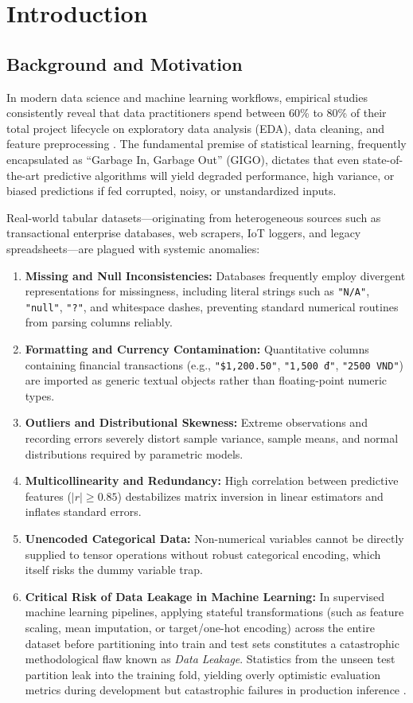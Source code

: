 \section{Introduction}

\subsection{Background and Motivation}
In modern data science and machine learning workflows, empirical studies consistently reveal that data practitioners spend between 60\% to 80\% of their total project lifecycle on exploratory data analysis (EDA), data cleaning, and feature preprocessing \cite{mckinney2010}. The fundamental premise of statistical learning, frequently encapsulated as ``Garbage In, Garbage Out'' (GIGO), dictates that even state-of-the-art predictive algorithms will yield degraded performance, high variance, or biased predictions if fed corrupted, noisy, or unstandardized inputs.

Real-world tabular datasets—originating from heterogeneous sources such as transactional enterprise databases, web scrapers, IoT loggers, and legacy spreadsheets—are plagued with systemic anomalies:
\begin{enumerate}[label=\arabic*.]
  \item \textbf{Missing and Null Inconsistencies:} Databases frequently employ divergent representations for missingness, including literal strings such as \texttt{"N/A"}, \texttt{"null"}, \texttt{"?"}, and whitespace dashes, preventing standard numerical routines from parsing columns reliably.
  \item \textbf{Formatting and Currency Contamination:} Quantitative columns containing financial transactions (e.g., \texttt{"\$1,200.50"}, \texttt{"1,500 đ"}, \texttt{"2500 VND"}) are imported as generic textual objects rather than floating-point numeric types.
  \item \textbf{Outliers and Distributional Skewness:} Extreme observations and recording errors severely distort sample variance, sample means, and normal distributions required by parametric models.
  \item \textbf{Multicollinearity and Redundancy:} High correlation between predictive features ($|r| \ge 0.85$) destabilizes matrix inversion in linear estimators and inflates standard errors.
  \item \textbf{Unencoded Categorical Data:} Non-numerical variables cannot be directly supplied to tensor operations without robust categorical encoding, which itself risks the dummy variable trap.
  \item \textbf{Critical Risk of Data Leakage in Machine Learning:} In supervised machine learning pipelines, applying stateful transformations (such as feature scaling, mean imputation, or target/one-hot encoding) across the entire dataset before partitioning into train and test sets constitutes a catastrophic methodological flaw known as \emph{Data Leakage}. Statistics from the unseen test partition leak into the training fold, yielding overly optimistic evaluation metrics during development but catastrophic failures in production inference \cite{pedregosa2011}.
\end{enumerate}

